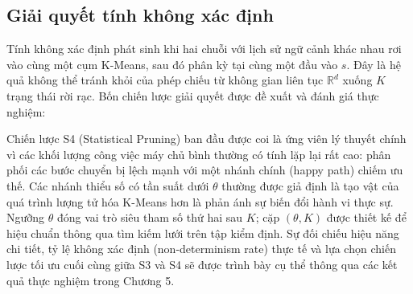 \documentclass[../main.tex]{subfiles}
\begin{document}
\subsection{Giải quyết tính không xác định}
\label{sec:nondeterminism}

Tính không xác định phát sinh khi hai chuỗi với lịch sử ngữ cảnh khác
nhau rơi vào cùng
một cụm K-Means, sau đó phân kỳ tại cùng một đầu vào $s$. Đây là hệ
quả không thể tránh
khỏi của phép chiếu từ không gian liên tục $\mathbb{R}^d$ xuống $K$
trạng thái rời rạc.
Bốn chiến lược giải quyết được đề xuất và đánh giá thực nghiệm:

\begin{table}[H]
  \caption{Các chiến lược giải quyết tính không xác định trong quá
  trình trích xuất DFA}
  \label{tab:nondeterminism}
  \centering
\end{table}

Chiến lược S4 (Statistical Pruning) ban đầu được coi là ứng viên lý
thuyết chính vì các khối lượng công
việc máy chủ bình thường có tính lặp lại rất cao: phân phối các bước
chuyển bị lệch mạnh
với một nhánh chính (happy path) chiếm ưu thế. Các nhánh thiểu số có
tần suất dưới
$\theta$ thường được giả định là tạo vật của quá trình lượng tử hóa
K-Means hơn là phản ánh sự biến
đổi hành vi thực sự. Ngưỡng $\theta$ đóng vai trò siêu tham số thứ
hai sau $K$; cặp
$(\theta, K)$ được thiết kế để hiệu chuẩn thông qua tìm kiếm lưới
trên tập kiểm định. Sự đối chiếu hiệu năng chi tiết, tỷ lệ không xác
định (non-determinism rate) thực tế và lựa chọn chiến lược tối ưu
cuối cùng giữa S3 và S4 sẽ được trình bày cụ thể thông qua các kết
quả thực nghiệm trong Chương 5.
\end{document}
